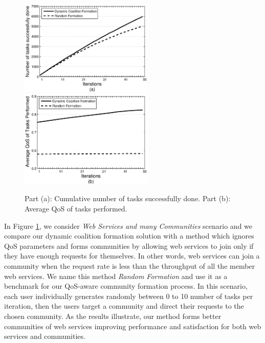 \begin{figure}%
\centering
\includegraphics[width=2.5in]{Figures/s2_task_done.eps}
\includegraphics[width=2.5in]{Figures/s2_task_qos.eps}
\caption{Part (a): Cumulative number of tasks successfully done.
Part (b): Average QoS of tasks performed.} \label{performancemany}
\end{figure}


In Figure \ref{performancemany}, we consider \emph{Web Services
and many Communities} scenario and we compare our dynamic
coalition formation solution with a method which ignores QoS
parameters and forms communities by allowing web services to join
only if they have enough requests for themselves. In other words,
web services can join a community when the request rate is less
than the throughput of all the member web services. We name this
method \emph{Random Formation} and use it as a benchmark for our
QoS-aware community formation process. In this scenario, each user
individually generates randomly between 0 to 10 number of tasks
per iteration, then the users target a community and direct their
requests to the chosen community. As the results illustrate, our
method forms better communities of web services improving
performance and satisfaction for both web services and
communities.

